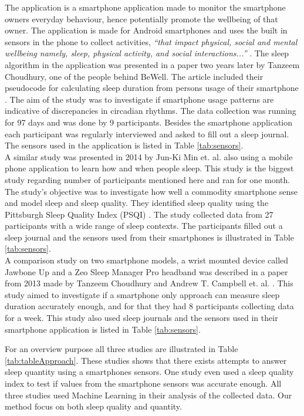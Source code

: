 \documentclass[12pt]{article} %
\begin{document}
The application is a smartphone application made to monitor the smartphone owners everyday behaviour, hence potentially promote the wellbeing of that owner. The application is made for Android smartphones and uses the built in sensors in the phone to collect activities, \textit{``that impact physical, social and mental wellbeing namely, sleep, physical activity, and social interactions...''} \cite{beWell}. The sleep algorithm in the application was presented in a paper two years later by Tanzeem Choudhury, one of the people behind BeWell. The article included their pseudocode for calculating sleep duration from persons usage of their smartphone \cite{bewellSleep}. The aim of the study was to investigate if smartphone usage patterns are indicative of discrepancies in circadian rhythms. The data collection was running for 97 days and was done by 9 participants. Besides the smartphone application each participant was regularly interviewed and asked to fill out a sleep journal. The sensors used in the application is listed in Table \ref{tab:sensors}.\\ 

A similar study was presented in 2014 by Jun-Ki Min et. al. \cite{toss} also using a mobile phone application to learn how and when people sleep. This study is the biggest study regarding number of participants mentioned here and ran for one month. The study's objective was to investigate how well a commodity smartphone sense and model sleep and sleep quality. They identified sleep quality using the Pittsburgh Sleep Quality Index (PSQI) \cite{quality}. The study collected data from 27 participants with a wide range of sleep contexts.  The participants filled out a sleep journal and the sensors used from their smartphones is illustrated in Table \ref{tab:sensors}. \\

A comparison study on two smartphone models, a wrist mounted device called Jawbone Up and a Zeo Sleep Manager Pro headband was described in a paper from 2013 made by Tanzeem Choudhury and Andrew T. Campbell et. al. \cite{compare}. This study aimed to investigate if a smartphone only approach can measure sleep duration accurately enough, and for that they had 8 participants collecting data for a week. This study also used sleep journals and the sensors used in their smartphone application is listed in Table \ref{tab:sensors}. 

For an overview purpose all three studies are illustrated in Table \ref{tab:tableApproach}. These studies shows that there exists attempts to answer sleep quantity using a smartphones sensors. One study even used a sleep quality index to test if values from the smartphone sensors was accurate enough. All three studies used Machine Learning in their analysis of the collected data. Our method focus on both sleep quality and quantity. \\
\end{document}
